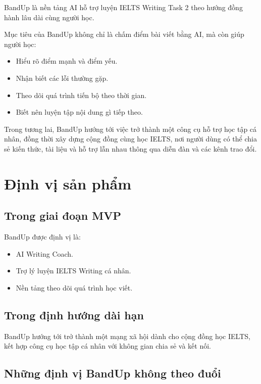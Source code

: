 \documentclass[12pt,a4paper]{article}
\begin{document}
BandUp là nền tảng AI hỗ trợ luyện IELTS Writing Task 2 theo hướng đồng hành lâu dài cùng người học.

Mục tiêu của BandUp không chỉ là chấm điểm bài viết bằng AI, mà còn giúp người học:

\begin{itemize}
  \item Hiểu rõ điểm mạnh và điểm yếu.
  \item Nhận biết các lỗi thường gặp.
  \item Theo dõi quá trình tiến bộ theo thời gian.
  \item Biết nên luyện tập nội dung gì tiếp theo.
\end{itemize}

Trong tương lai, BandUp hướng tới việc trở thành một công cụ hỗ trợ học tập cá nhân, đồng thời xây dựng cộng đồng cùng học IELTS, nơi người dùng có thể chia sẻ kiến thức, tài liệu và hỗ trợ lẫn nhau thông qua diễn đàn và các kênh trao đổi.

\section{Định vị sản phẩm}

\subsection{Trong giai đoạn MVP}

BandUp được định vị là:

\begin{itemize}
  \item AI Writing Coach.
  \item Trợ lý luyện IELTS Writing cá nhân.
  \item Nền tảng theo dõi quá trình học viết.
\end{itemize}

\subsection{Trong định hướng dài hạn}

BandUp hướng tới trở thành một mạng xã hội dành cho cộng đồng học IELTS, kết hợp công cụ học tập cá nhân với không gian chia sẻ và kết nối.

\subsection{Những định vị BandUp không theo đuổi}
\end{document}
